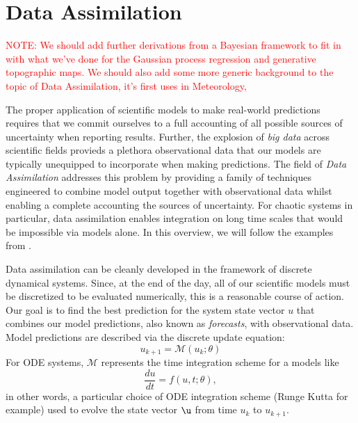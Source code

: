 



\section{Data Assimilation}

\textcolor{red}{NOTE: We should add further derivations from a Bayesian framework to fit in with what we've done for the Gaussian process regression and generative topographic maps. We should also add some more generic background to the topic of Data Assimilation, it's first uses in Meteorology, }


The proper application of scientific models to make real-world predictions requires that we commit ourselves to a full accounting of all possible sources of uncertainty when reporting results. Further, the explosion of \textit{big data} across scientific fields provieds a plethora observational data that our models are typically unequipped to incorporate when making predictions. The field of \textit{Data Assimilation} addresses this problem by providing a family of techniques engineered to combine model output together with observational data whilst enabling a complete accounting the sources of uncertainty. For chaotic systems in particular, data assimilation enables integration on long time scales that would be impossible via models alone. In this overview, we will follow the examples from \cite{pyda}.

Data assimilation can be cleanly developed in the framework of discrete dynamical systems. Since, at the end of the day, all of our scientific models must be discretized to be evaluated numerically, this is a reasonable course of action. Our goal is to find the best prediction for the system state vector $u$ that combines our model predictions, also known as \textit{forecasts}, with observational data. Model predictions are described via the discrete update equation:
\begin{equation}
    u_{k+1} = \mathcal{M}(u_k; \theta)
\end{equation}
For ODE systems, $\mathcal{M}$ represents the time integration scheme for a models like
\begin{equation}
    \dfrac{du}{dt} = f(u, t; \theta),
\end{equation}
in other words, a particular choice of ODE integration scheme (Runge Kutta for example) used to evolve the state vector $\u$ from time $u_k$ to $u_{k+1}$.

